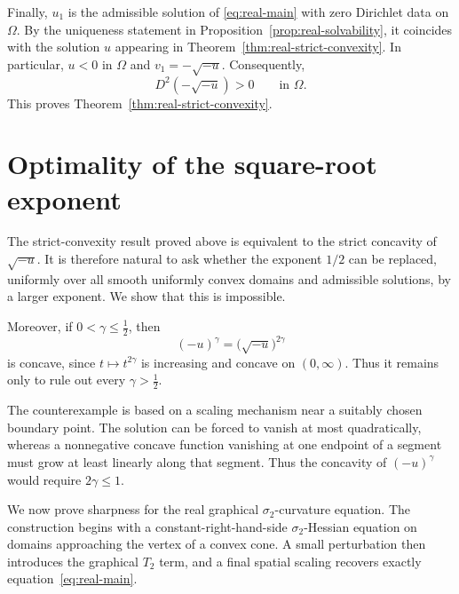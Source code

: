 \documentclass{article}
\numberwithin{equation}{section}
\begin{document}
Finally, $u_1$ is the admissible solution of \eqref{eq:real-main}
with zero Dirichlet data on $\Omega$. By the uniqueness statement in
Proposition~\ref{prop:real-solvability}, it coincides with the
solution $u$ appearing in
Theorem~\ref{thm:real-strict-convexity}. In particular, $u<0$ in
$\Omega$ and $v_1=-\sqrt{-u}$. Consequently,
\[
D^2(-\sqrt{-u})>0
\qquad\text{in }\Omega.
\]
This proves Theorem~\ref{thm:real-strict-convexity}.




\section{Optimality of the square-root exponent}
\label{sec:square-root-optimality}

The strict-convexity result proved above is equivalent to the
strict concavity of $\sqrt{-u}$. It is therefore natural to ask
whether the exponent $1/2$ can be replaced, uniformly over all
smooth uniformly convex domains and admissible solutions, by a
larger exponent. We show that this is impossible.

Moreover, if $0<\gamma\le \frac12$, then
\[
(-u)^\gamma
=
\bigl(\sqrt{-u}\bigr)^{2\gamma}
\]
is concave, since $t\mapsto t^{2\gamma}$ is increasing and concave
on $(0,\infty)$. Thus it remains only to rule out every
$\gamma>\frac12$.

The counterexample is based on a scaling mechanism near a suitably
chosen boundary point. The solution can be forced to vanish at most
quadratically, whereas a nonnegative concave function vanishing at
one endpoint of a segment must grow at least linearly along that
segment. Thus the concavity of $(-u)^\gamma$ would require
$2\gamma\le1$.


We now prove sharpness for the real graphical
$\sigma_2$-curvature equation. The construction begins with a
constant-right-hand-side $\sigma_2$-Hessian equation on domains
approaching the vertex of a convex cone. A small perturbation then
introduces the graphical $T_2$ term, and a final spatial scaling
recovers exactly equation~\eqref{eq:real-main}.
\end{document}
